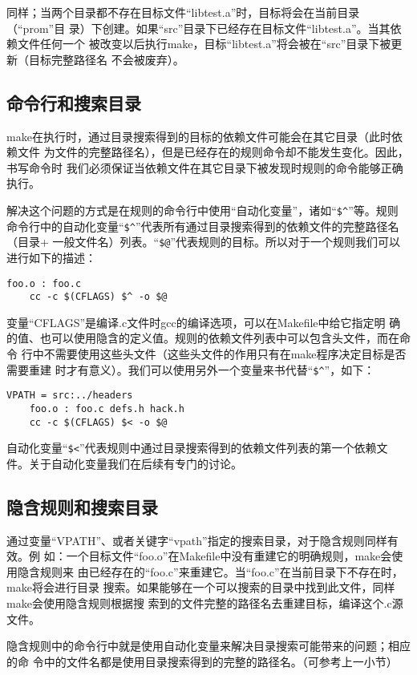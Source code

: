 同样；当两个目录都不存在目标文件“libtest.a”时，目标将会在当前目录（“prom”目
录）下创建。如果“src”目录下已经存在目标文件“libtest.a”。当其依赖文件任何一个
被改变以后执行make，目标“libtest.a”将会被在“src”目录下被更新（目标完整路径名
不会被废弃）。

\subsection{命令行和搜索目录}
make在执行时，通过目录搜索得到的目标的依赖文件可能会在其它目录（此时依赖文件
为文件的完整路径名），但是已经存在的规则命令却不能发生变化。因此，书写命令时
我们必须保证当依赖文件在其它目录下被发现时规则的命令能够正确执行。

解决这个问题的方式是在规则的命令行中使用“自动化变量”，诸如“\verb"$^"”等。规则
命令行中的自动化变量“\verb"$^"”代表所有通过目录搜索得到的依赖文件的完整路径名
（目录+ 一般文件名）列表。“\verb"$@"”代表规则的目标。所以对于一个规则我们可以
进行如下的描述：

\begin{Verbatim}[]
foo.o : foo.c
    cc -c $(CFLAGS) $^ -o $@
\end{Verbatim}

\noindent
变量“CFLAGS”是编译.c文件时gcc的编译选项，可以在Makefile中给它指定明
确的值、也可以使用隐含的定义值。规则的依赖文件列表中可以包含头文件，而在命令
行中不需要使用这些头文件（这些头文件的作用只有在make程序决定目标是否需要重建
时才有意义）。我们可以使用另外一个变量来书代替“\verb"$^"”，如下：

\begin{Verbatim}[]
VPATH = src:../headers
    foo.o : foo.c defs.h hack.h
    cc -c $(CFLAGS) $< -o $@
\end{Verbatim}

自动化变量“\verb"$<"”代表规则中通过目录搜索得到的依赖文件列表的第一个依赖文
件。关于自动化变量我们在后续有专门的讨论。

\subsection{隐含规则和搜索目录}
通过变量“VPATH”、或者关键字“vpath”指定的搜索目录，对于隐含规则同样有效。例
如：一个目标文件“foo.o”在Makefile中没有重建它的明确规则，make会使用隐含规则来
由已经存在的“foo.c”来重建它。当“foo.c”在当前目录下不存在时，make将会进行目录
搜索。如果能够在一个可以搜索的目录中找到此文件，同样make会使用隐含规则根据搜
索到的文件完整的路径名去重建目标，编译这个.c源文件。

隐含规则中的命令行中就是使用自动化变量来解决目录搜索可能带来的问题；相应的命
令中的文件名都是使用目录搜索得到的完整的路径名。（可参考上一小节）

